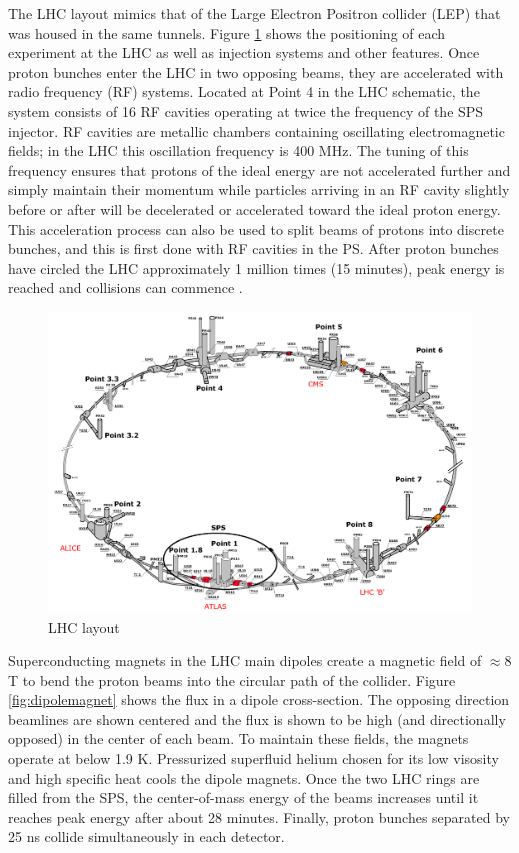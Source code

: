 The LHC layout mimics that of the Large Electron Positron collider (LEP) that was housed in the same tunnels. Figure \ref{fig:LHClayout} shows the positioning of each experiment at the LHC as well as injection systems and other features. Once proton bunches enter the LHC in two opposing beams, they are accelerated with radio frequency (RF) systems. Located at Point 4 in the LHC schematic, the system consists of 16 RF cavities operating at twice the frequency of the SPS injector. RF cavities are metallic chambers containing oscillating electromagnetic fields; in the LHC this oscillation frequency is 400 MHz. The tuning of this frequency ensures that protons of the ideal energy are not accelerated further and simply maintain their momentum while particles arriving in an RF cavity slightly before or after will be decelerated or accelerated toward the ideal proton energy. This acceleration process can also be used to split beams of protons into discrete bunches, and this is first done with RF cavities in the PS. After proton bunches have circled the LHC approximately 1 million times (15 minutes), peak energy is reached and collisions can commence \cite{radiofrequency}.

\begin{figure}[!h]
        \centering
    \includegraphics[width=.6\textwidth]{Pictures/LHClayout.PNG}
    \caption{LHC layout \cite{LHCref}}
    \label{fig:LHClayout}
\end{figure}

Superconducting magnets in the LHC main dipoles create a magnetic field of $\approx 8$ T to bend the proton beams into the circular path of the collider. Figure \ref{fig:dipolemagnet} shows the flux in a dipole cross-section. The opposing direction beamlines are shown centered and the flux is shown to be high (and directionally opposed) in the center of each beam. To maintain these fields, the magnets operate at below 1.9 K. Pressurized superfluid helium chosen for its low visosity and high specific heat cools the dipole magnets. Once the two LHC rings are filled from the SPS, the center-of-mass energy of the beams increases until it reaches peak energy after about 28 minutes. Finally, proton bunches separated by 25 ns collide simultaneously in each detector.  

